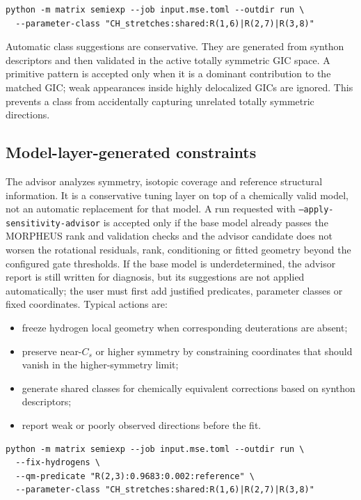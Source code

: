 \documentclass[11pt]{article}
\begin{document}
\begin{lstlisting}[style=oracle]
python -m matrix semiexp --job input.mse.toml --outdir run \
  --parameter-class "CH_stretches:shared:R(1,6)|R(2,7)|R(3,8)"
\end{lstlisting}

\noindent
Automatic class suggestions are conservative.  They are generated from
synthon descriptors and then validated in the active totally symmetric GIC
space.  A primitive pattern is accepted only when it is a dominant contribution
to the matched GIC; weak appearances inside highly delocalized GICs are
ignored.  This prevents a class from accidentally capturing unrelated
totally symmetric directions.

\subsection{Model-layer-generated constraints}

The advisor analyzes symmetry, isotopic coverage and reference structural
information.  It is a conservative tuning layer on top of a chemically valid
model, not an automatic replacement for that model.  A run requested with
\texttt{--apply-sensitivity-advisor} is accepted only if the base model already
passes the MORPHEUS rank and validation checks and the advisor candidate does
not worsen the rotational residuals, rank, conditioning or fitted geometry
beyond the configured gate thresholds.  If the base model is underdetermined,
the advisor report is still written for diagnosis, but its suggestions are not
applied automatically; the user must first add justified predicates, parameter
classes or fixed coordinates.  Typical actions are:

\begin{itemize}
  \item freeze hydrogen local geometry when corresponding deuterations are
        absent;
  \item preserve near-\(C_s\) or higher symmetry by constraining coordinates
        that should vanish in the higher-symmetry limit;
  \item generate shared classes for chemically equivalent corrections based
        on synthon descriptors;
  \item report weak or poorly observed directions before the fit.
\end{itemize}

\begin{lstlisting}[style=oracle]
python -m matrix semiexp --job input.mse.toml --outdir run \
  --fix-hydrogens \
  --qm-predicate "R(2,3):0.9683:0.002:reference" \
  --parameter-class "CH_stretches:shared:R(1,6)|R(2,7)|R(3,8)"
\end{lstlisting}
\end{document}
